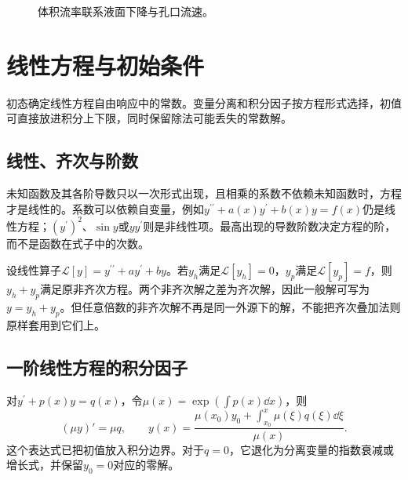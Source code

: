 \begin{solution}
\begin{figure}[H]\centering
{}
\caption{体积流率联系液面下降与孔口流速。}\label{fig:c2-e1-s}
\end{figure}
\end{solution}





\section{线性方程与初始条件}\label{sec:c2-linear}
初态确定线性方程自由响应中的常数。变量分离和积分因子按方程形式选择，初值可直接放进积分上下限，同时保留除法可能丢失的常数解。

\subsection{线性、齐次与阶数}
未知函数及其各阶导数只以一次形式出现，且相乘的系数不依赖未知函数时，方程才是线性的。系数可以依赖自变量，例如$y^{\prime\prime}+a(x)y^{\prime}+b(x)y=f(x)$仍是线性方程；$(y^{\prime})^2$、$\sin y$或$yy^{\prime}$则是非线性项。最高出现的导数阶数决定方程的阶，而不是函数在式子中的次数。

设线性算子$\mathcal L[y]=y^{\prime\prime}+ay^{\prime}+by$。若$y_h$满足$\mathcal L[y_h]=0$，$y_p$满足$\mathcal L[y_p]=f$，则$y_h+y_p$满足原非齐次方程。两个非齐次解之差为齐次解，因此一般解可写为$y=y_h+y_p$。但任意倍数的非齐次解不再是同一外源下的解，不能把齐次叠加法则原样套用到它们上。

\subsection{一阶线性方程的积分因子}
对$y^{\prime}+p(x)y=q(x)$，令$\mu(x)=\exp(\int p(x)\dd x)$，则
\[(\mu y)'=\mu q,\qquad
y(x)=\frac{\mu(x_0)y_0+\int_{x_0}^x\mu(\xi)q(\xi)\dd\xi}{\mu(x)}.
\]
这个表达式已把初值放入积分边界。对于$q=0$，它退化为分离变量的指数衰减或增长式，并保留$y_0=0$对应的零解。

